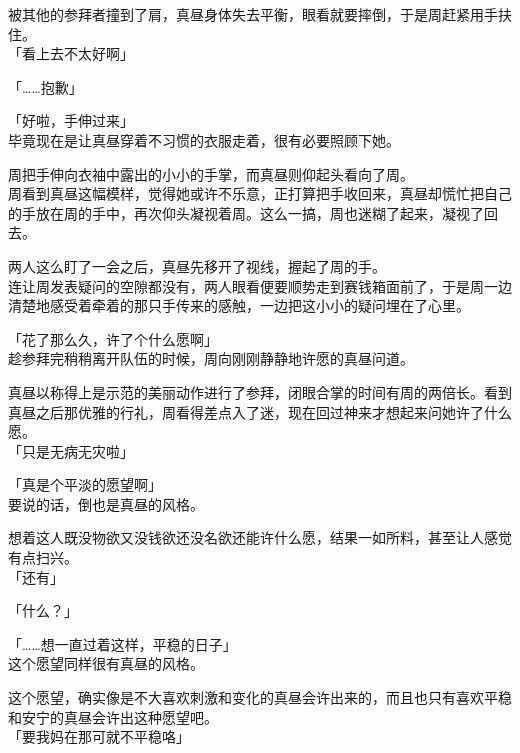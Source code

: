 被其他的参拜者撞到了肩，真昼身体失去平衡，眼看就要摔倒，于是周赶紧用手扶住。\\

「看上去不太好啊」

「……抱歉」

「好啦，手伸过来」\\

毕竟现在是让真昼穿着不习惯的衣服走着，很有必要照顾下她。

周把手伸向衣袖中露出的小小的手掌，而真昼则仰起头看向了周。\\

周看到真昼这幅模样，觉得她或许不乐意，正打算把手收回来，真昼却慌忙把自己的手放在周的手中，再次仰头凝视着周。这么一搞，周也迷糊了起来，凝视了回去。

两人这么盯了一会之后，真昼先移开了视线，握起了周的手。\\

连让周发表疑问的空隙都没有，两人眼看便要顺势走到赛钱箱面前了，于是周一边清楚地感受着牵着的那只手传来的感触，一边把这小小的疑问埋在了心里。\\

\vspace{2\baselineskip}

「花了那么久，许了个什么愿啊」\\

趁参拜完稍稍离开队伍的时候，周向刚刚静静地许愿的真昼问道。

真昼以称得上是示范的美丽动作进行了参拜，闭眼合掌的时间有周的两倍长。看到真昼之后那优雅的行礼，周看得差点入了迷，现在回过神来才想起来问她许了什么愿。\\

「只是无病无灾啦」

「真是个平淡的愿望啊」\\

要说的话，倒也是真昼的风格。

想着这人既没物欲又没钱欲还没名欲还能许什么愿，结果一如所料，甚至让人感觉有点扫兴。\\

「还有」

「什么？」

「……想一直过着这样，平稳的日子」\\

这个愿望同样很有真昼的风格。

这个愿望，确实像是不大喜欢刺激和变化的真昼会许出来的，而且也只有喜欢平稳和安宁的真昼会许出这种愿望吧。\\

「要我妈在那可就不平稳咯」

